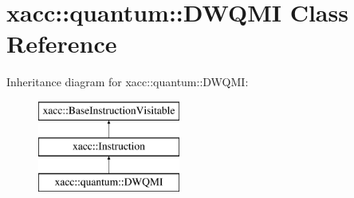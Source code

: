 \hypertarget{a00987}{}\section{xacc\+:\+:quantum\+:\+:D\+W\+Q\+MI Class Reference}
\label{a00987}
Inheritance diagram for xacc\+:\+:quantum\+:\+:D\+W\+Q\+MI\+:\begin{figure}[H]
\begin{center}
\leavevmode
\includegraphics[height=3.000000cm]{a00987}
\end{center}
\end{figure}
